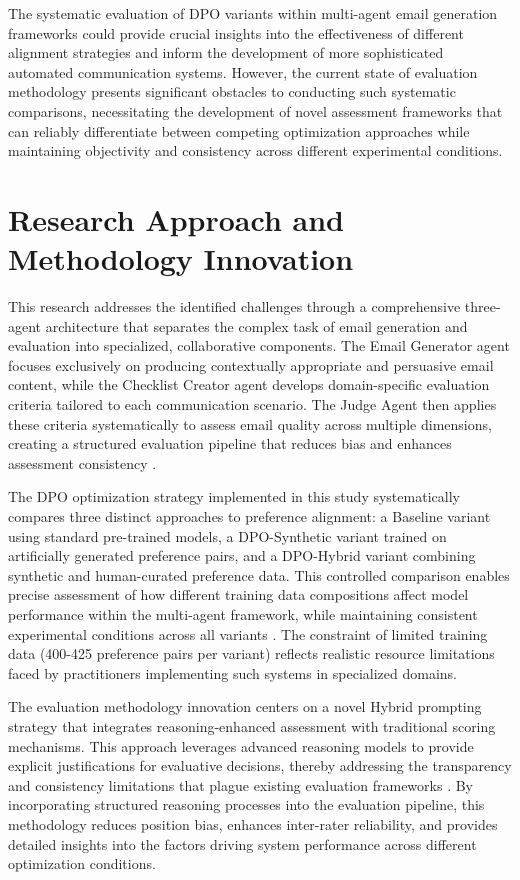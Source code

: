The systematic evaluation of DPO variants within multi-agent email generation frameworks could provide crucial insights into the effectiveness of different alignment strategies and inform the development of more sophisticated automated communication systems. However, the current state of evaluation methodology presents significant obstacles to conducting such systematic comparisons, necessitating the development of novel assessment frameworks that can reliably differentiate between competing optimization approaches while maintaining objectivity and consistency across different experimental conditions.

\section{Research Approach and Methodology Innovation}

This research addresses the identified challenges through a comprehensive three-agent architecture that separates the complex task of email generation and evaluation into specialized, collaborative components. The Email Generator agent focuses exclusively on producing contextually appropriate and persuasive email content, while the Checklist Creator agent develops domain-specific evaluation criteria tailored to each communication scenario. The Judge Agent then applies these criteria systematically to assess email quality across multiple dimensions, creating a structured evaluation pipeline that reduces bias and enhances assessment consistency \cite{li2024generation_to_judgment, rony2022rome}.

The DPO optimization strategy implemented in this study systematically compares three distinct approaches to preference alignment: a Baseline variant using standard pre-trained models, a DPO-Synthetic variant trained on artificially generated preference pairs, and a DPO-Hybrid variant combining synthetic and human-curated preference data. This controlled comparison enables precise assessment of how different training data compositions affect model performance within the multi-agent framework, while maintaining consistent experimental conditions across all variants \cite{rafailov2023dpo, feng2024dpo_limitations}. The constraint of limited training data (400-425 preference pairs per variant) reflects realistic resource limitations faced by practitioners implementing such systems in specialized domains.

The evaluation methodology innovation centers on a novel Hybrid prompting strategy that integrates reasoning-enhanced assessment with traditional scoring mechanisms. This approach leverages advanced reasoning models to provide explicit justifications for evaluative decisions, thereby addressing the transparency and consistency limitations that plague existing evaluation frameworks \cite{marjanovic2025deepseek_thoughtology, xu2025contextual_judge_bench}. By incorporating structured reasoning processes into the evaluation pipeline, this methodology reduces position bias, enhances inter-rater reliability, and provides detailed insights into the factors driving system performance across different optimization conditions.

